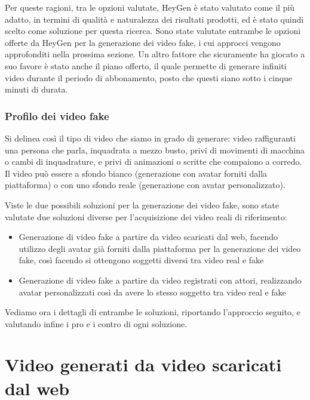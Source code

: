 Per queste ragioni, tra le opzioni valutate, HeyGen è stato valutato come il più adatto, in termini di qualità e naturalezza dei risultati prodotti, ed è stato quindi scelto come soluzione per questa ricerca. Sono state valutate entrambe le opzioni offerte da HeyGen per la generazione dei video fake, i cui approcci vengono approfonditi nella prossima sezione. Un altro fattore che sicuramente ha giocato a suo favore è stato anche il piano offerto, il quale permette di generare infiniti video durante il periodo di abbonamento, posto che questi siano sotto i cinque minuti di durata.

\subsubsection{Profilo dei video fake}
Si delinea così il tipo di video che siamo in grado di generare: video raffiguranti una persona che parla, inquadrata a mezzo busto, privi di movimenti di macchina o cambi di inquadrature, e privi di animazioni o scritte che compaiono a corredo. Il video può essere a sfondo bianco (generazione con avatar forniti dalla piattaforma) o con uno sfondo reale (generazione con avatar personalizzato).

Viste le due possibili soluzioni per la generazione dei video fake, sono state valutate due soluzioni diverse per l'acquisizione dei video reali di riferimento:
\begin{itemize}
    \item Generazione di video fake a partire da video scaricati dal web, facendo utilizzo degli avatar già forniti dalla piattaforma per la generazione dei video fake, così facendo si ottengono soggetti diversi tra video real e fake
    \item Generazione di video fake a partire da video registrati con attori, realizzando avatar personalizzati così da avere lo stesso soggetto tra video real e fake
\end{itemize}

Vediamo ora i dettagli di entrambe le soluzioni, riportando l'approccio seguito, e valutando infine i pro e i contro di ogni soluzione.

\section{Video generati da video scaricati dal web}

